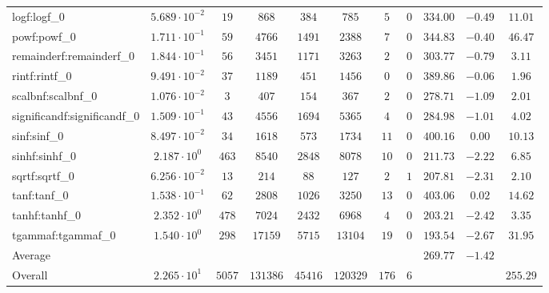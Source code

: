 \begin{tabular}{|l|c|c|c|c|c|c|c|c|c|c|}
logf:logf\_0                 & $ 5.689 \cdot 10^{-2} $ & $ 19     $ & $ 868    $ & $ 384   $ & $ 785    $ & $ 5   $ & $ 0 $ & $ 334.00      $ & $ -0.49   $ & $ 11.01   $ \\
powf:powf\_0                 & $ 1.711 \cdot 10^{-1} $ & $ 59     $ & $ 4766   $ & $ 1491  $ & $ 2388   $ & $ 7   $ & $ 0 $ & $ 344.83      $ & $ -0.40   $ & $ 46.47   $ \\
remainderf:remainderf\_0     & $ 1.844 \cdot 10^{-1} $ & $ 56     $ & $ 3451   $ & $ 1171  $ & $ 3263   $ & $ 2   $ & $ 0 $ & $ 303.77      $ & $ -0.79   $ & $ 3.11    $ \\
rintf:rintf\_0               & $ 9.491 \cdot 10^{-2} $ & $ 37     $ & $ 1189   $ & $ 451   $ & $ 1456   $ & $ 0   $ & $ 0 $ & $ 389.86      $ & $ -0.06   $ & $ 1.96    $ \\
scalbnf:scalbnf\_0           & $ 1.076 \cdot 10^{-2} $ & $ 3      $ & $ 407    $ & $ 154   $ & $ 367    $ & $ 2   $ & $ 0 $ & $ 278.71      $ & $ -1.09   $ & $ 2.01    $ \\
significandf:significandf\_0 & $ 1.509 \cdot 10^{-1} $ & $ 43     $ & $ 4556   $ & $ 1694  $ & $ 5365   $ & $ 4   $ & $ 0 $ & $ 284.98      $ & $ -1.01   $ & $ 4.02    $ \\
sinf:sinf\_0                 & $ 8.497 \cdot 10^{-2} $ & $ 34     $ & $ 1618   $ & $ 573   $ & $ 1734   $ & $ 11  $ & $ 0 $ & $ 400.16      $ & $ 0.00    $ & $ 10.13   $ \\
sinhf:sinhf\_0               & $ 2.187 \cdot 10^{0}  $ & $ 463    $ & $ 8540   $ & $ 2848  $ & $ 8078   $ & $ 10  $ & $ 0 $ & $ 211.73      $ & $ -2.22   $ & $ 6.85    $ \\
sqrtf:sqrtf\_0               & $ 6.256 \cdot 10^{-2} $ & $ 13     $ & $ 214    $ & $ 88    $ & $ 127    $ & $ 2   $ & $ 1 $ & $ 207.81      $ & $ -2.31   $ & $ 2.10    $ \\
tanf:tanf\_0                 & $ 1.538 \cdot 10^{-1} $ & $ 62     $ & $ 2808   $ & $ 1026  $ & $ 3250   $ & $ 13  $ & $ 0 $ & $ 403.06      $ & $ 0.02    $ & $ 14.62   $ \\
tanhf:tanhf\_0               & $ 2.352 \cdot 10^{0}  $ & $ 478    $ & $ 7024   $ & $ 2432  $ & $ 6968   $ & $ 4   $ & $ 0 $ & $ 203.21      $ & $ -2.42   $ & $ 3.35    $ \\
tgammaf:tgammaf\_0           & $ 1.540 \cdot 10^{0}  $ & $ 298    $ & $ 17159  $ & $ 5715  $ & $ 13104  $ & $ 19  $ & $ 0 $ & $ 193.54      $ & $ -2.67   $ & $ 31.95   $ \\
\hline
Average                      & $                     $ & $        $ & $        $ & $       $ & $        $ & $     $ & $   $ & $ 269.77      $ & $ -1.42   $ & $         $ \\
\hline
Overall                      & $ 2.265 \cdot 10^{1}  $ & $ 5057   $ & $ 131386 $ & $ 45416 $ & $ 120329 $ & $ 176 $ & $ 6 $ & $             $ & $         $ & $ 255.29  $ \\
\hline
\end{tabular}
